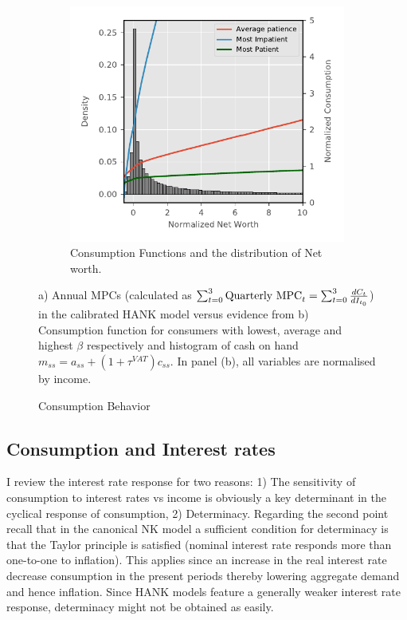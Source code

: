 \begin{figure}[H]
{\begin{subfigure}{.5\textwidth}
  \includegraphics[width=.99\linewidth]{mainmatter/plots/SS_evaluation/Consumption_function.pdf}
  \caption{Consumption Functions and the distribution of Net worth. } \label{fig:MPC_wealth_SS}
\end{subfigure}
}
\caption[Caption for LOF]{Consumption Behavior}
\label{fig:SS_dists}
  {\scriptsize  a) Annual MPCs (calculated as $\sum_{t=0}^{3}\text{\ensuremath{\text{Quarterly MPC}_{t}}}=\sum_{t=0}^{3}\frac{dC_{t}}{dI_{t_{0}}}$) in the calibrated HANK model versus evidence from \citet{fagereng2019mpc} b) Consumption function for consumers with lowest, average and highest $\beta$ respectively and histogram of cash on hand $m_{ss}= a_{ss} + (1+\tau^{VAT}) c_{ss}$. In panel (b), all variables are normalised by income. }
\end{figure}


\subsection{Consumption and Interest rates}
I review the interest rate response for two reasons: 1) The sensitivity of consumption to interest rates vs income is obviously a key determinant in the cyclical response of consumption, 2) Determinacy. Regarding the second point recall that in the canonical NK model a sufficient condition for determinacy is that the Taylor principle is satisfied (nominal interest rate responds more than one-to-one to inflation). This applies since an increase in the real interest rate decrease consumption in the present periods thereby lowering aggregate demand and hence inflation. Since HANK models feature a generally weaker interest rate response, determinacy might not be obtained as easily.  


